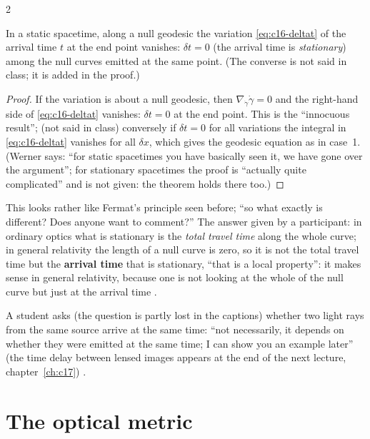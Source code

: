 \begin{paracol}{2}
\begin{theorem}\label{thm:c16-fermat}
In a static spacetime, along a null geodesic the variation \eqref{eq:c16-deltat} of the arrival time $t$ at the end point vanishes: $\delta t=0$ (the arrival time is \emph{stationary}) among the null curves emitted at the same point. (The converse is not said in class; it is added in the proof.)
\end{theorem}
\begin{proof}
If the variation is about a null geodesic, then $\nabla_{\dot\gamma}\dot\gamma=0$ and the right-hand side of \eqref{eq:c16-deltat} vanishes: $\delta t=0$ at the end point. This is the ``innocuous result''; (not said in class) conversely if $\delta t=0$ for all variations the integral in \eqref{eq:c16-deltat} vanishes for all $\delta x$, which gives the geodesic equation as in case~1. (Werner says: ``for static spacetimes you have basically seen it, we have gone over the argument''; for stationary spacetimes the proof is ``actually quite complicated'' and is not given: the theorem holds there too.) 
\end{proof}
This looks rather like Fermat's principle seen before; ``so what exactly is different? Does anyone want to comment?'' The answer given by a participant: in ordinary optics what is stationary is the \emph{total travel time} along the whole curve; in general relativity the length of a null curve is zero, so it is not the total travel time but the \textbf{arrival time} that is stationary, ``that is a local property'': it makes sense in general relativity, because one is not looking at the whole of the null curve but just at the arrival time .
\begin{coursenote}
A student asks (the question is partly lost in the captions) whether two light rays from the same source arrive at the same time: ``not necessarily, it depends on whether they were emitted at the same time; I can show you an example later'' (the time delay between lensed images appears at the end of the next lecture, chapter~\ref{ch:c17}) .
\end{coursenote}

\section{The optical metric}\label{sec:c16-optical}


\end{paracol}
